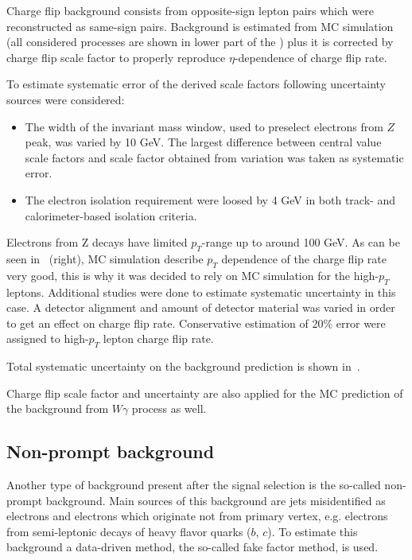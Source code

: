 Charge flip background consists from opposite-sign lepton pairs which were reconstructed as same-sign pairs.
Background is estimated from MC simulation (all considered processes are shown in lower part of the ) 
plus it is corrected by charge flip scale factor to properly reproduce $\eta$-dependence 
of charge flip rate.


To estimate systematic error of the derived scale factors following uncertainty sources were considered:
\begin{itemize}
 \item The width of the invariant mass window, used to preselect electrons from $Z$ peak, was varied by 10 GeV.
 The largest difference between central value scale factors and scale factor obtained from variation was taken as systematic error.
 \item The electron isolation requirement were loosed by 4 GeV in both track- and calorimeter-based isolation criteria.
\end{itemize}
Electrons from Z decays have limited $p_T$-range up to around 100 GeV. As can be seen in~ (right), 
MC simulation describe $p_T$ dependence of the charge flip rate very good, this is why it was decided to rely on MC simulation 
for the high-$p_T$ leptons. Additional studies were done to estimate systematic uncertainty in this case.
A detector alignment and amount of detector material was varied in order to get an effect on charge flip rate.
Conservative estimation of 20$\%$ error were assigned to high-$p_T$ lepton charge flip rate.

Total systematic uncertainty on the background prediction is shown in~.

Charge flip scale factor and uncertainty are also applied for the MC prediction of the background from $W\gamma$ process as well.

\subsection{Non-prompt background}
\label{subsec:fakes_description}

Another type of background present after the signal selection is the so-called non-prompt background.
Main sources of this background are jets misidentified as electrons and electrons which originate not from 
primary vertex, e.g. electrons from semi-leptonic decays of heavy flavor quarks ($b$, $c$).
To estimate this background a data-driven method, the so-called fake factor method, is used.

